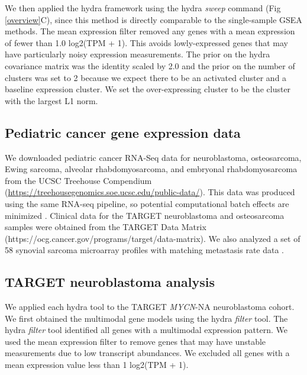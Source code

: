 \documentclass[10pt,letterpaper]{article}
\begin{document}
We then applied the hydra framework using the hydra \textit{sweep} command (Fig \ref{overview}C), since this method is directly comparable to the single-sample GSEA methods. The mean expression filter removed any genes with a mean expression of fewer than 1.0 log2(TPM + 1). This avoids lowly-expressed genes that may have particularly noisy expression measurements. The prior on the hydra covariance matrix was the identity scaled by 2.0 and the prior on the number of clusters was set to 2 because we expect there to be an activated cluster and a baseline expression cluster. We set the over-expressing cluster to be the cluster with the largest L1 norm.


\subsection*{Pediatric cancer gene expression data}
We downloaded pediatric cancer RNA-Seq data for neuroblastoma, osteosarcoma, Ewing sarcoma, alveolar rhabdomyosarcoma, and embryonal rhabdomyosarcoma from the UCSC Treehouse Compendium (\url{https://treehousegenomics.soe.ucsc.edu/public-data/}). This data was produced using the same RNA-seq pipeline, so potential computational batch effects are minimized \cite{vivianToilEnablesReproducible2017,vaskeComparativeTumorRNA2019}. Clinical data for the TARGET neuroblastoma and osteosarcoma samples were obtained from the TARGET Data Matrix (https://ocg.cancer.gov/programs/target/data-matrix). We also analyzed a set of 58 synovial sarcoma microarray profiles with matching metastasis rate data \cite{lagardeChromosomeInstabilityAccounts2013}.

\subsection*{TARGET neuroblastoma analysis}
We applied each hydra tool to the TARGET \textit{MYCN}-NA neuroblastoma cohort. We first obtained the multimodal gene models using the hydra \textit{filter} tool. The hydra \textit{filter} tool identified all genes with a multimodal expression pattern. We used the mean expression filter to remove genes that may have unstable measurements due to low transcript abundances. We excluded all genes with a mean expression value less than 1 log2(TPM + 1).
\end{document}
